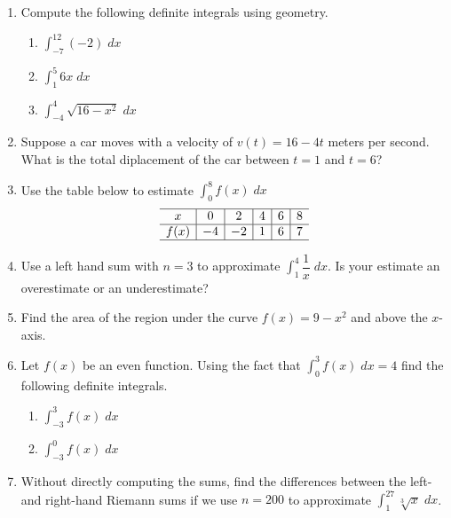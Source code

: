 \documentclass[11pt]{article}
\newcommand{\ds}{\displaystyle}
\begin{document}
\drawtitle

\begin{enumerate}
\item Compute the following definite integrals using geometry.
  \begin{enumerate}
  \item $\ds\int_{-7}^{12} (-2)\;dx$
    \vfill
  \item $\ds\int_1^5 6x \;dx$
    \vfill
    \newpage
  \item $\ds\int_{-4}^4 \sqrt{16-x^2}\;dx$
    \vfill
  \end{enumerate}

\item Suppose a car moves with a velocity of $v(t) = 16 - 4t$ meters
  per second.  What is the total diplacement of the car between $t =
  1$ and $t = 6$?
  \vfill

  \newpage

\item Use the table below to estimate $\ds\int_0^{8} f(x)\;dx$
  \[
  \begin{array}{c|c|c|c|c|c}
    \hline
    x&0&2&4&6&8\\
    \hline
    f(x)&-4&-2&1&6&7\\
    \hline
  \end{array}
  \]

  \newpage

\item Use a left hand sum with $n=3$ to approximate
  $\ds\int_1^4\dfrac{1}{x}\;dx$.  Is your estimate an overestimate or
  an underestimate?

  \vfill

\item Find the area of the region under the curve $f(x)=9-x^2$ and
  above the $x$-axis.

  \vfill

  \newpage

\item Let $f(x)$ be an even function.  Using the fact that
  $\ds\int_0^3 f(x)\;dx = 4$ find the following definite integrals.
  \begin{enumerate}
  \item $\ds\int_{-3}^3 f(x)\;dx$
    \vfill
  \item $\ds\int_{-3}^0 f(x)\;dx$
    \vfill
  \end{enumerate}

  \newpage

\item Without directly computing the sums, find the differences between
  the left- and right-hand Riemann sums if we use $n=200$ to
  approximate $\ds\int_1^{27}\sqrt[3]{x}\;dx$.

  
\end{enumerate}
\end{document}
